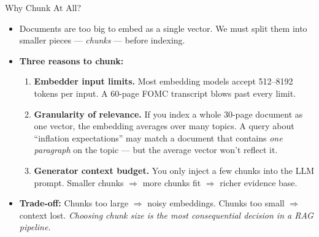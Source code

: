 \documentclass[10pt,english,aspectratio=169]{beamer}
\begin{document}
\begin{frame}{Why Chunk At All?}
\begin{itemize}
\item Documents are too big to embed as a single vector. We must split them into smaller pieces --- \emph{chunks} --- before indexing.

\medskip
\item \textbf{Three reasons to chunk:}
\begin{enumerate}
    \item \textbf{Embedder input limits.} Most embedding models accept 512--8192 tokens per input. A 60-page FOMC transcript blows past every limit.
    \item \textbf{Granularity of relevance.} If you index a whole 30-page document as one vector, the embedding averages over many topics. A query about ``inflation expectations'' may match a document that contains \emph{one paragraph} on the topic --- but the average vector won't reflect it.
    \item \textbf{Generator context budget.} You only inject a few chunks into the LLM prompt. Smaller chunks $\Rightarrow$ more chunks fit $\Rightarrow$ richer evidence base.
\end{enumerate}

\medskip
\item \textbf{Trade-off:} Chunks too large $\Rightarrow$ noisy embeddings. Chunks too small $\Rightarrow$ context lost. \emph{Choosing chunk size is the most consequential decision in a RAG pipeline.}
\end{itemize}
\end{frame}
\end{document}
